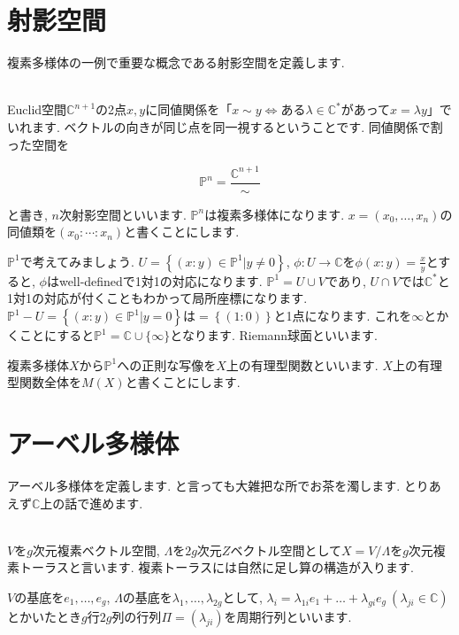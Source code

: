 \documentclass{jsarticle}
\theoremstyle{definition}
\numberwithin{theorem}{section}
\begin{document}
\section{射影空間}
複素多様体の一例で重要な概念である射影空間を定義します.

\hrulefill\\

Euclid空間$\mathbb{C}^{n+1}$の2点$x, y$に同値関係を「$x\sim y\Leftrightarrow $ある$\lambda \in \mathbb{C}^*$があって$x = \lambda y$」でいれます. ベクトルの向きが同じ点を同一視するということです. 同値関係で割った空間を

\begin{equation*}
\mathbb{P}^n = \frac{\mathbb{C}^{n+1}}{\sim}
\end{equation*}

と書き, $n$次射影空間といいます. $\mathbb{P}^n$は複素多様体になります. $x = (x_0, \ldots, x_n)$の同値類を$(x_0 : \cdots : x_n)$と書くことにします.

$\mathbb{P}^1$で考えてみましょう. $U = \left\{(x:y) \in \mathbb{P}^1 | y \neq 0\right\}$, $\phi: U \rightarrow \mathbb{C}$を$\phi(x:y) = \frac{x}{y}$とすると, $\phi$はwell-definedで1対1の対応になります. $\mathbb{P}^1 = U\cup V$であり, $U\cap V$では$\mathbb{C}^*$と1対1の対応が付くこともわかって局所座標になります. $\mathbb{P}^1 - U = \left\{(x:y) \in \mathbb{P}^1 | y = 0\right\}$は$ = \left\{(1:0)\right\}$と1点になります. これを$\infty$とかくことにすると$\mathbb{P}^1 = \mathbb{C} \cup \{\infty\}$となります. Riemann球面といいます. 

複素多様体$X$から$\mathbb{P}^1$への正則な写像を$X$上の有理型関数といいます. $X$上の有理型関数全体を$M(X)$と書くことにします.
\newpage
\section{アーベル多様体}
アーベル多様体を定義します. と言っても大雑把な所でお茶を濁します. とりあえず$\mathbb{C}$上の話で進めます.

\hrulefill\\

$V$を$g$次元複素ベクトル空間, $\Lambda$を$2g$次元$Z$ベクトル空間として$X = V/\Lambda$を$g$次元複素トーラスと言います. 複素トーラスには自然に足し算の構造が入ります. 

$V$の基底を$e_1, \ldots, e_g$, $\Lambda$の基底を$\lambda_1, \ldots, \lambda_{2g}$として, $\lambda_i = \lambda_{1i}e_1 + \ldots + \lambda_{gi}e_g\ (\lambda_{ji} \in \mathbb{C})$とかいたとき$g$行$2g$列の行列$\Pi = (\lambda_{ji})$を周期行列といいます.
\end{document}
